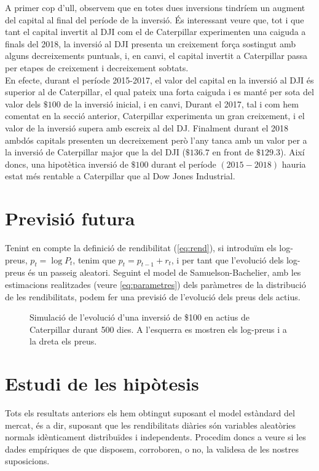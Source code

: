\documentclass{article}
\numberwithin{table}{section}
\numberwithin{figure}{section}
\numberwithin{equation}{section}
\begin{document}
A primer cop d'ull, observem que en totes dues inversions tindríem un augment del capital al final del període de la inversió. És interessant veure que, tot i que tant el capital invertit al DJI com el de Caterpillar experimenten una caiguda a finals del 2018, la inversió al DJI presenta un creixement força sostingut amb alguns decreixements puntuals, i, en canvi, el capital invertit a Caterpillar passa per etapes de creixement i decreixement sobtats.\\
En efecte, durant el període 2015-2017, el valor del capital en la inversió al DJI és superior al de Caterpillar, el qual pateix una forta caiguda i es manté per sota del valor dels $\$100$ de la inversió inicial, i en canvi, Durant el 2017, tal i com hem comentat en la secció anterior, Caterpillar experimenta un gran creixement, i el valor de la inversió supera amb escreix al del DJ. Finalment durant el 2018 ambdós capitals presenten un decreixement però l'any tanca amb un valor per a la inversió de Caterpillar major que la del DJI  ($\$136.7$ en front de  $\$129.3$). Així doncs, una hipotètica inversió de $\$100$ durant el període $(2015-2018)$ hauria estat més rentable a Caterpillar que al Dow Jones Industrial.





\section{Previsió futura}
Tenint en compte la definició de rendibilitat (\ref{eq:rend}), si introduïm els log-preus, \( p_t = \log{P_t} \), tenim que \( p_t = p_{t-1} + r_t \), i per tant que l'evolució dels log-preus és un passeig aleatori. Seguint el model de Samuelson-Bachelier, amb les estimacions realitzades (veure \ref{eq:parametres}) dels paràmetres de la distribució de les rendibilitats, podem fer una previsió de l'evolució dels preus dels actius.  



\begin{figure}[htb]
	\centering \sffamily \small
	
	\caption{Simulació de l'evolució d'una inversió de \$100 en actius de Caterpillar durant 500 dies. A l'esquerra es mostren els log-preus i a la dreta els preus.}
	\label{fig:simulacio}
\end{figure}



\section{Estudi de les hipòtesis}
Tots els resultats anteriors els hem obtingut suposant el model estàndard del mercat, és a dir, suposant que les rendibilitats diàries són variables aleatòries normals idènticament distribuïdes i independents. Procedim doncs a veure si les dades empíriques de que disposem, corroboren, o no, la validesa de les nostres suposicions.
\end{document}
